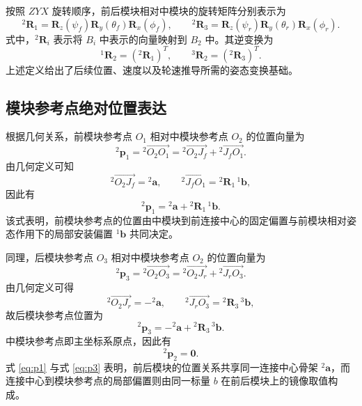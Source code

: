 按照 $ZYX$ 旋转顺序，前后模块相对中模块的旋转矩阵分别表示为
\begin{equation}
{}^{2}\mathbf R_1=
\mathbf R_z(\psi_f)\mathbf R_y(\theta_f)\mathbf R_x(\phi_f),
\qquad
{}^{2}\mathbf R_3=
\mathbf R_z(\psi_r)\mathbf R_y(\theta_r)\mathbf R_x(\phi_r).
\end{equation}
式中，${}^{2}\mathbf R_i$ 表示将 ${B_i}$ 中表示的向量映射到 ${B_2}$ 中。其逆变换为
\begin{equation}
{}^{1}\mathbf R_2=({}^{2}\mathbf R_1)^T,
\qquad
{}^{3}\mathbf R_2=({}^{2}\mathbf R_3)^T.
\end{equation}
上述定义给出了后续位置、速度以及轮速推导所需的姿态变换基础。

\subsection{模块参考点绝对位置表达}

根据几何关系，前模块参考点 $O_1$ 相对中模块参考点 $O_2$ 的位置向量为
\begin{equation}
{}^{2}\mathbf p_1
=
{}^{2}\overrightarrow{O_2O_1}
=
{}^{2}\overrightarrow{O_2J_f}
+
{}^{2}\overrightarrow{J_fO_1}.
\end{equation}
由几何定义可知
\begin{equation}
{}^{2}\overrightarrow{O_2J_f}={}^{2}\mathbf a,
\qquad
{}^{2}\overrightarrow{J_fO_1}={}^{2}\mathbf R_1\,{}^{1}\mathbf b,
\end{equation}
因此有
\begin{equation}
{}^{2}\mathbf p_1
=
{}^{2}\mathbf a+{}^{2}\mathbf R_1\,{}^{1}\mathbf b.
\label{eq:p1}
\end{equation}
该式表明，前模块参考点的位置由中模块到前连接中心的固定偏置与前模块相对姿态作用下的局部安装偏置 ${}^{1}\mathbf b$ 共同决定。

同理，后模块参考点 $O_3$ 相对中模块参考点 $O_2$ 的位置向量为
\begin{equation}
{}^{2}\mathbf p_3
=
{}^{2}\overrightarrow{O_2O_3}
=
{}^{2}\overrightarrow{O_2J_r}
+
{}^{2}\overrightarrow{J_rO_3}.
\end{equation}
由几何定义可得
\begin{equation}
{}^{2}\overrightarrow{O_2J_r}=-{}^{2}\mathbf a,
\qquad
{}^{2}\overrightarrow{J_rO_3}={}^{2}\mathbf R_3\,{}^{3}\mathbf b,
\end{equation}
故后模块参考点位置为
\begin{equation}
{}^{2}\mathbf p_3
=
-{}^{2}\mathbf a+{}^{2}\mathbf R_3\,{}^{3}\mathbf b.
\label{eq:p3}
\end{equation}
中模块参考点即主坐标系原点，因此有
\begin{equation}
{}^{2}\mathbf p_2=\mathbf 0.
\end{equation}
式 \eqref{eq:p1} 与式 \eqref{eq:p3} 表明，前后模块的位置关系共享同一连接中心骨架 ${}^{2}\mathbf a$，而连接中心到模块参考点的局部偏置则由同一标量 $b$ 在前后模块上的镜像取值构成。

